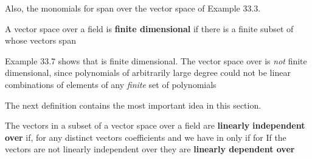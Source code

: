 \documentclass[11pt,oneside]{article}
\begin{document}
\begin{BookBody}
\noindent Also, the monomials  for  span  over  the vector space of Example 33.3. \BookEnd{\blacktriangle}

 A vector space  over a field  is\textbf{ finite dimensional} if there is a finite subset of  whose vectors span \BookEnd{\blacksquare}

 Example 33.7 shows that  is finite dimensional. The vector space  over  is \textit{not} finite dimensional, since polynomials of arbitrarily large degree could not be linear combinations of elements of any\textit{ finite} set of polynomials\BookEnd{\blacktriangle}

The next definition contains the most important idea in this section.

 The vectors in a subset  of a vector space  over a field  are\textbf{ linearly} \textbf{independent over}  if, for any distinct vectors  coefficients  and   we have  in  only if  for  If the vectors are not linearly independent over  they are\textbf{ linearly dependent over} \BookEnd{\blacksquare}

\end{BookBody}

\BookNarrativetrue
\end{document}
